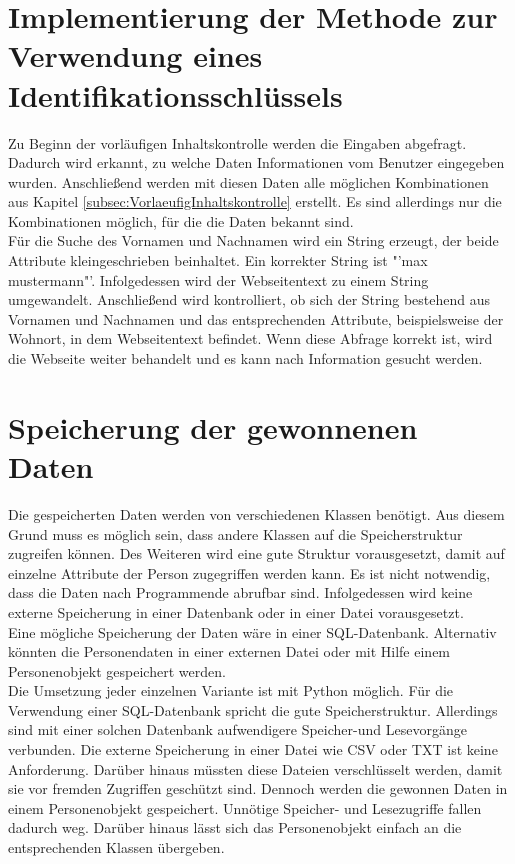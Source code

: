 \section{Implementierung der Methode zur Verwendung eines Identifikationsschlüssels}
Zu Beginn der vorläufigen Inhaltskontrolle werden die Eingaben abgefragt. Dadurch wird erkannt, zu welche Daten Informationen vom Benutzer eingegeben wurden. Anschließend werden mit diesen Daten alle möglichen Kombinationen aus Kapitel \ref{subsec:VorlaeufigInhaltskontrolle} erstellt. Es sind allerdings nur die Kombinationen möglich, für die die Daten bekannt sind.\\
Für die Suche des Vornamen und Nachnamen wird ein String erzeugt, der beide Attribute kleingeschrieben beinhaltet. Ein korrekter String ist "'max mustermann"'. Infolgedessen wird der Webseitentext zu einem String umgewandelt. Anschließend wird kontrolliert, ob sich der String bestehend aus Vornamen und Nachnamen und das entsprechenden Attribute, beispielsweise der Wohnort, in dem Webseitentext befindet. Wenn diese Abfrage korrekt ist, wird die Webseite weiter behandelt und es kann nach Information gesucht werden.

\section{Speicherung der gewonnenen Daten}
Die gespeicherten Daten werden von verschiedenen Klassen benötigt. Aus diesem Grund muss es möglich sein, dass andere Klassen auf die Speicherstruktur zugreifen können. Des Weiteren wird eine gute Struktur vorausgesetzt, damit auf einzelne Attribute der Person zugegriffen werden kann. Es ist nicht notwendig, dass die Daten nach Programmende abrufbar sind. Infolgedessen wird keine externe Speicherung in einer Datenbank oder in einer Datei vorausgesetzt.\\
Eine mögliche Speicherung der Daten wäre in einer SQL-Datenbank. Alternativ könnten die Personendaten in einer externen Datei oder mit Hilfe einem Personenobjekt gespeichert werden.\\
Die Umsetzung jeder einzelnen Variante ist mit Python möglich. Für die Verwendung einer SQL-Datenbank spricht die gute Speicherstruktur. Allerdings sind mit einer solchen Datenbank aufwendigere Speicher-und Lesevorgänge verbunden. Die externe Speicherung in einer Datei wie CSV oder TXT ist keine Anforderung. Darüber hinaus müssten diese Dateien verschlüsselt werden, damit sie vor fremden Zugriffen geschützt sind. Dennoch werden die gewonnen Daten in einem Personenobjekt gespeichert. Unnötige Speicher- und Lesezugriffe fallen dadurch weg. Darüber hinaus lässt sich das Personenobjekt einfach an die entsprechenden Klassen übergeben.
